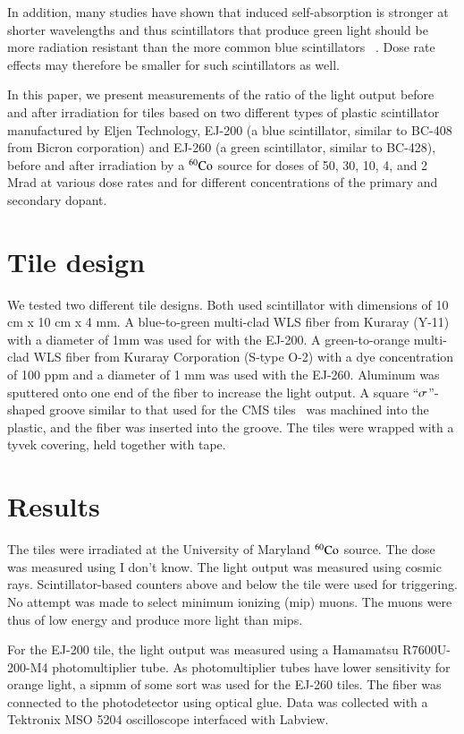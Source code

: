\documentclass[review]{elsarticle}
\begin{document}
In addition, many studies have shown that induced self-absorption is stronger 
at shorter wavelengths and thus scintillators that produce green light should
be more radiation resistant than the more common blue scintillators
~\cite{Bross199135,sauli,Giokaris1993315}.  Dose rate effects may
therefore be smaller for such scintillators as well.

In this paper, we present measurements of the ratio of the light output before and after irradiation
for tiles based on two different types of plastic scintillator manufactured by Eljen Technology, EJ-200 (a blue scintillator, 
similar to BC-408 from Bicron corporation) 
and 
EJ-260 (a green scintillator, similar to BC-428), before and after irradiation by a $\rm {^{60}Co}$ source for doses of 50, 30, 10, 4, and 2 Mrad at various dose rates and for different concentrations of the primary and secondary dopant.


\section{Tile design}
We tested two different tile designs.  Both used scintillator
with dimensions of 10 cm x 10 cm x 4 mm.  A blue-to-green multi-clad WLS fiber
from Kuraray (Y-11) with a diameter of 1mm was used for with the EJ-200.  A green-to-orange multi-clad WLS fiber from Kuraray Corporation 
(S-type O-2) with a dye concentration of 100 ppm and a diameter of 1 mm was used with the EJ-260.  Aluminum was sputtered onto one end of the fiber
to increase the light output.
A square ``${\rm \sigma}$''-shaped groove similar to that used for the 
CMS tiles~\cite{CMSHB} was machined into the plastic, and the fiber was inserted
into the groove.  The tiles were wrapped with a tyvek covering, held together with tape.


\section{Results}
The tiles were irradiated at the University of Maryland
${\rm ^{60}Co}$ source.  The dose was measured using
{\color{red} I don't know.}  The light output was measured using cosmic rays.
Scintillator-based counters above and below the tile were used for triggering.
  No attempt was made to select minimum ionizing (mip) muons.  The muons were thus
of low energy and produce more light than mips.

For the EJ-200 tile, the light output was measured using a Hamamatsu
R7600U-200-M4 photomultiplier tube.  As photomultiplier tubes have lower sensitivity for orange light, a {\color{red} sipmm of some sort} was used for the EJ-260 tiles.
The fiber was connected
to the photodetector using optical glue.  Data was collected with a Tektronix MSO 5204 oscilloscope interfaced with Labview.
\end{document}
